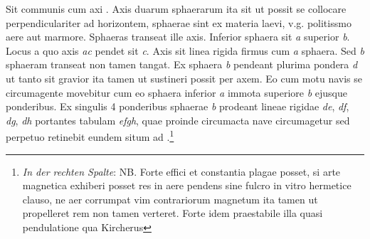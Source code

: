 Sit communis cum axi . Axis duarum sphaerarum ita sit ut  possit se collocare perpendiculariter ad horizontem, sphaerae sint ex materia laevi, v.g. politissmo aere aut marmore. Sphaeras transeat ille axis. Inferior sphaera sit \textit{a} superior \textit{b}. Locus a quo axis \textit{ac} pendet sit \textit{c}. Axis sit linea rigida firmus cum \textit{a} sphaera. Sed \textit{b} sphaeram transeat non tamen tangat. Ex sphaera \textit{b} pendeant  plurima pondera \textit{d} ut tanto sit gravior ita tamen ut sustineri possit per axem. Eo cum motu navis\protect{} se circumagente movebitur cum eo sphaera inferior \textit{a} immota superiore \textit{b} ejusque ponderibus. Ex singulis 4 ponderibus sphaerae \textit{b} prodeant lineae rigidae \textit{de}, \textit{df}, \textit{dg}, \textit{dh} portantes tabulam \textit{efgh}, quae proinde circumacta nave\protect{}  circumagetur sed perpetuo retinebit eundem situm ad .\footnote{\textit{In der rechten Spalte}: NB. Forte effici et constantia plagae posset, si arte magnetica exhiberi posset res in aere pendens sine fulcro in vitro hermetice clauso, ne aer corrumpat vim contrariorum magnetum\protect{} ita tamen ut propelleret rem non tamen verteret. Forte idem praestabile illa quasi pendulatione qua Kircherus 
}
